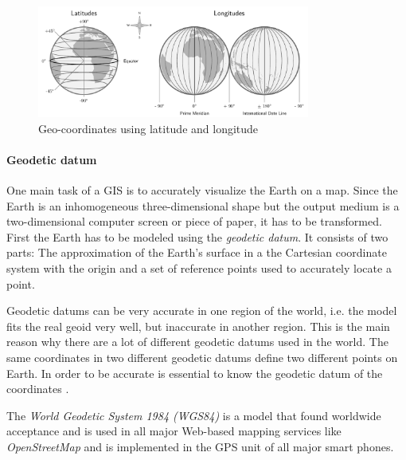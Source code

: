 \begin{figure}[ht]
  \centering
  \includegraphics[width=0.8\textwidth]{graphics/basics/geo-coordinates}
  \caption{Geo-coordinates using latitude and longitude}
  \label{fig:geo-coordinates}
\end{figure}




\paragraph{Geodetic datum} %
\label{par:geodetic_datum}


One main task of a GIS is to accurately visualize the Earth on a map. Since the Earth is an inhomogeneous three-dimensional shape but the output medium is a two-dimensional computer screen or piece of paper, it has to be transformed. First the Earth has to be modeled using the \emph{geodetic datum}. It consists of two parts: The approximation of the Earth's surface in a the Cartesian coordinate system with the origin and a set of reference points used to accurately locate a point.

Geodetic datums can be very accurate in one region of the world, i.e. the model fits the real geoid very well, but inaccurate in another region. This is the main reason why there are a lot of different geodetic datums used in the world. The same coordinates in two different geodetic datums define two different points on Earth. In order to be accurate is essential to know the geodetic datum of the coordinates
\cite[p. 80]{bolstad2008gis}.

The \emph{World Geodetic System 1984 (WGS84)} is a model that found worldwide acceptance and is used in all major Web-based mapping services like \emph{OpenStreetMap} and is implemented in the GPS unit of all major smart phones.





